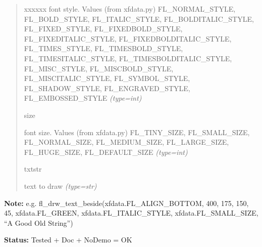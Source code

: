 \begin{boxedminipage}{\funcwidth}
\begin{quote}
\begin{Ventry}{xxxxxx}
font style. Values (from xfdata.py) FL\_NORMAL\_STYLE, FL\_BOLD\_STYLE,
FL\_ITALIC\_STYLE, FL\_BOLDITALIC\_STYLE, FL\_FIXED\_STYLE, FL\_FIXEDBOLD\_STYLE,
FL\_FIXEDITALIC\_STYLE, FL\_FIXEDBOLDITALIC\_STYLE, FL\_TIMES\_STYLE,
FL\_TIMESBOLD\_STYLE, FL\_TIMESITALIC\_STYLE, FL\_TIMESBOLDITALIC\_STYLE,
FL\_MISC\_STYLE, FL\_MISCBOLD\_STYLE, FL\_MISCITALIC\_STYLE, FL\_SYMBOL\_STYLE,
FL\_SHADOW\_STYLE, FL\_ENGRAVED\_STYLE, FL\_EMBOSSED\_STYLE
            {\it (type=int)}

          \item[size]


font size. Values (from xfdata.py) FL\_TINY\_SIZE, FL\_SMALL\_SIZE,
FL\_NORMAL\_SIZE, FL\_MEDIUM\_SIZE, FL\_LARGE\_SIZE, FL\_HUGE\_SIZE,
FL\_DEFAULT\_SIZE
            {\it (type=int)}

          \item[txtstr]


text to draw
            {\it (type=str)}

        \end{Ventry}

      \end{quote}

\textbf{Note:} 
e.g. fl\_drw\_text\_beside(xfdata.FL\_ALIGN\_BOTTOM, 400, 175, 150, 45,
xfdata.FL\_GREEN, xfdata.FL\_ITALIC\_STYLE, xfdata.FL\_SMALL\_SIZE,
``A Good Old String'')


\textbf{Status:} 
Tested + Doc + NoDemo = OK


    \end{boxedminipage}

    \label{xformslib:flbasic:fl_drw_text_cursor}

    \vspace{0.5ex}

